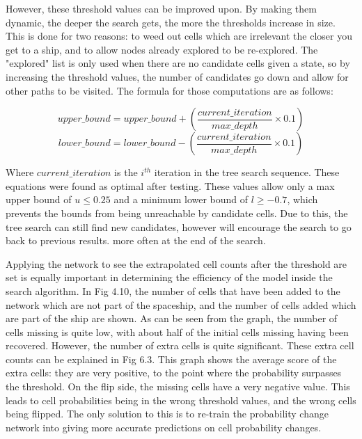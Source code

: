 \documentclass{l4proj}
\begin{document}
However, these threshold values can be improved upon. By making them dynamic, the deeper the search gets, the more the thresholds increase in size. This is done for two reasons: to weed out cells which are irrelevant the closer you get to a ship, and to allow nodes already explored to be re-explored. The "explored" list is only used when there are no candidate cells given a state, so by increasing the threshold values, the number of candidates go down and allow for other paths to be visited. The formula for those computations are as follows:

\[ upper\_bound = upper\_bound + (\frac{current\_iteration}{max\_depth} \times  0.1)\]
\[ lower\_bound = lower\_bound - (\frac{current\_iteration}{max\_depth} \times  0.1) \]

Where $current\_iteration$ is the $i^{th}$ iteration in the tree search sequence. These equations were found as optimal after testing. These values allow only a max upper bound of $u \leq 0.25$ and a minimum lower bound of $l \geq -0.7$, which prevents the bounds from being unreachable by candidate cells. Due to this, the tree search can still find new candidates, however will encourage the search to go back to previous results. more often at the end of the search.

Applying the network to see the extrapolated cell counts after the threshold are set is equally important in determining the efficiency of the model inside the search algorithm. In Fig 4.10, the number of cells that have been added to the network which are not part of the spaceship, and the number of cells added which are part of the ship are shown. As can be seen from the graph, the number of cells missing is quite low, with about half of the initial cells missing having been recovered. However, the number of extra cells is quite significant. These extra cell counts can be explained in Fig 6.3. This graph shows the average score of the extra cells: they are very positive, to the point where the probability surpasses the threshold. On the flip side, the missing cells have a very negative value. This leads to cell probabilities being in the wrong threshold values, and the wrong cells being flipped. The only solution to this is to re-train the probability change network into giving more accurate predictions on cell probability changes.
\end{document}
